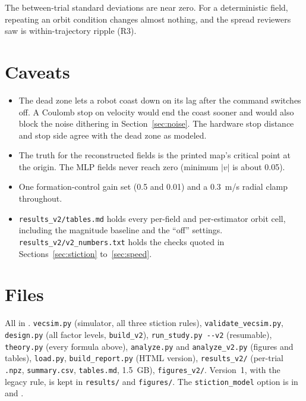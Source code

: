 \documentclass[10pt,letterpaper]{article}
\begin{document}
The between-trial standard deviations are near zero. For a deterministic field, repeating an orbit condition changes almost nothing, and the spread reviewers saw is within-trajectory ripple (R3).

\section*{Caveats}

\begin{itemize}
\item The dead zone lets a robot coast down on its lag after the command switches off. A Coulomb stop on velocity would end the coast sooner and would also block the noise dithering in Section~\ref{sec:noise}. The hardware stop distance and stop side agree with the dead zone as modeled.
\item The truth for the reconstructed fields is the printed map's critical point at the origin. The MLP fields never reach zero (minimum $|v|$ is about 0.05).
\item One formation-control gain set (0.5 and 0.01) and a 0.3~m/s radial clamp throughout.
\item \texttt{results\_v2/tables.md} holds every per-field and per-estimator orbit cell, including the magnitude baseline and the ``off'' settings. \texttt{results\_v2/v2\_numbers.txt} holds the checks quoted in Sections~\ref{sec:stiction} to~\ref{sec:speed}.
\end{itemize}

\section*{Files}

{\raggedright All in . \texttt{vecsim.py} (simulator, all three stiction rules), \texttt{validate\_vecsim.py}, \texttt{design.py} (all factor levels, \texttt{build\_v2}), \texttt{run\_study.py -{}-v2} (resumable), \texttt{theory.py} (every formula above), \texttt{analyze.py} and \texttt{analyze\_v2.py} (figures and tables), \texttt{load.py}, \texttt{build\_report.py} (HTML version), \texttt{results\_v2/} (per-trial \texttt{.npz}, \texttt{summary.csv}, \texttt{tables.md}, 1.5~GB), \texttt{figures\_v2/}. Version~1, with the legacy rule, is kept in \texttt{results/} and \texttt{figures/}. The \texttt{stiction\_model} option is in  and .\par}
\end{document}
